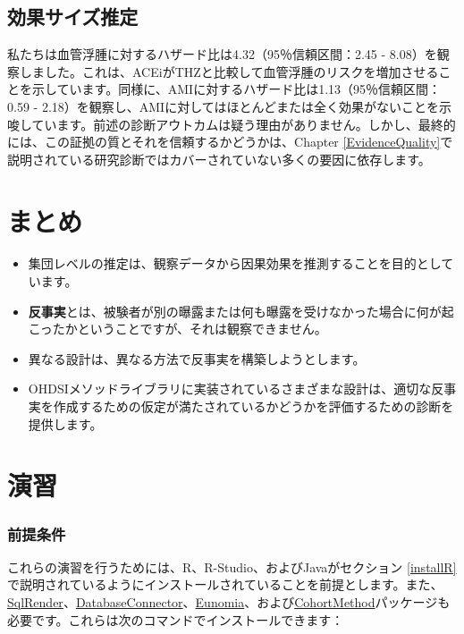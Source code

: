 \documentclass[
  11pt]{book}
\makeatletter
\newenvironment{kframe}{%
\medskip{}
\setlength{\fboxsep}{.8em}
 \def\at@end@of@kframe{}%
 \ifinner\ifhmode%
  \def\at@end@of@kframe{\end{minipage}}%
  \begin{minipage}{\columnwidth}%
 \fi\fi%
 \def\FrameCommand##1{\hskip\@totalleftmargin \hskip-\fboxsep
 \colorbox{myShadeColor}{##1}\hskip-\fboxsep
     \hskip-\linewidth \hskip-\@totalleftmargin \hskip\columnwidth}%
 \MakeFramed {\advance\hsize-\width
   \@totalleftmargin\z@ \linewidth\hsize
   \@setminipage}}%
 {\par\unskip\endMakeFramed%
 \at@end@of@kframe}
\newenvironment{rmdblock}[1]
  {
  \begin{itemize}
  \renewcommand{\labelitemi}{
    \raisebox{-.7\height}[0pt][0pt]{
      {\setkeys{Gin}{width=3em,keepaspectratio}\texttt{[image: images/\#1]}}
    }
  }
  \setlength{\fboxsep}{1em}
  \begin{kframe}
  \item
  }
  {
  \end{kframe}
  \end{itemize}
  }
\newenvironment{rmdsummary}
  {\begin{rmdblock}{summary}}
  {\end{rmdblock}}
\theoremstyle{definition}
\theoremstyle{definition}
\theoremstyle{definition}
\theoremstyle{definition}
\theoremstyle{remark}
\makeatother
\begin{document}
\subsection{効果サイズ推定}\label{ux52b9ux679cux30b5ux30a4ux30baux63a8ux5b9a}

私たちは血管浮腫に対するハザード比は4.32（95％信頼区間：2.45 - 8.08）を観察しました。これは、ACEiがTHZと比較して血管浮腫のリスクを増加させることを示しています。同様に、AMIに対するハザード比は1.13（95％信頼区間：0.59 - 2.18）を観察し、AMIに対してはほとんどまたは全く効果がないことを示唆しています。前述の診断アウトカムは疑う理由がありません。しかし、最終的には、この証拠の質とそれを信頼するかどうかは、Chapter \ref{EvidenceQuality}で説明されている研究診断ではカバーされていない多くの要因に依存します。

\section{まとめ}\label{ux307eux3068ux3081-9}

\begin{rmdsummary}
\begin{itemize}
\item
  集団レベルの推定は、観察データから因果効果を推測することを目的としています。
\item
  \textbf{反事実}とは、被験者が別の曝露または何も曝露を受けなかった場合に何が起こったかということですが、それは観察できません。
\item
  異なる設計は、異なる方法で反事実を構築しようとします。
\item
  OHDSIメソッドライブラリに実装されているさまざまな設計は、適切な反事実を作成するための仮定が満たされているかどうかを評価するための診断を提供します。
\end{itemize}
\end{rmdsummary}

\section{演習}\label{ux6f14ux7fd2-7}

\subsubsection*{前提条件}\label{ux524dux63d0ux6761ux4ef6-7}

これらの演習を行うためには、R、R-Studio、およびJavaがセクション \ref{installR} で説明されているようにインストールされていることを前提とします。また、\href{https://ohdsi.github.io/SqlRender/}{SqlRender}、\href{https://ohdsi.github.io/DatabaseConnector/}{DatabaseConnector}、\href{https://ohdsi.github.io/Eunomia/}{Eunomia}、および\href{https://ohdsi.github.io/CohortMethod/}{CohortMethod}パッケージも必要です。これらは次のコマンドでインストールできます：
\end{document}
